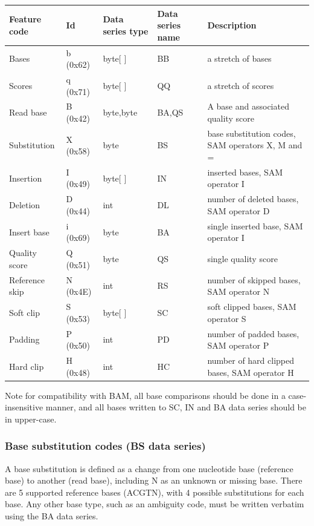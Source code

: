 \documentclass[a4paper]{article}
\begin{document}
\begin{tabular}{|>{\raggedright}p{91pt}|>{\raggedright}p{45pt}|>{\raggedright}p{72pt}|>{\raggedright}p{66pt}|>{\raggedright}p{132pt}|}
\hline
\textbf{Feature code} & \textbf{Id} & \textbf{Data series type} & \textbf{Data 
series name} & \textbf{Description}\tabularnewline
\hline
Bases & b (0x62) & byte[ ] & BB & a stretch of bases\tabularnewline
\hline
Scores & q (0x71) & byte[ ] & QQ & a stretch of scores\tabularnewline
\hline
%
Read base & B (0x42) & byte,byte & BA,QS & A base and associated quality score\tabularnewline
\hline
Substitution & X (0x58) & byte & BS & base substitution codes, SAM operators X, 
M and =\tabularnewline
\hline
Insertion & I (0x49) & byte[ ] & IN & inserted bases, SAM operator I\tabularnewline
\hline
Deletion & D (0x44) & int & DL & number of deleted bases, SAM operator D\tabularnewline
\hline
Insert base & i (0x69) & byte & BA & single inserted base, SAM operator I\tabularnewline
\hline
Quality score & Q (0x51) & byte & QS & single quality score\tabularnewline
\hline
Reference skip & N (0x4E) & int & RS & number of skipped bases, SAM operator N\tabularnewline
\hline
Soft clip & S (0x53) & byte[ ] & SC & soft clipped bases, SAM operator S\tabularnewline
\hline
Padding & P (0x50) & int & PD & number of padded bases, SAM operator P\tabularnewline
\hline
Hard clip & H (0x48) & int & HC & number of hard clipped bases, SAM operator H\tabularnewline
\hline
\end{tabular}

Note for compatibility with BAM, all base comparisons should be done
in a case-insensitive manner, and all bases written to SC, IN and BA
data series should be in upper-case.

\subsubsection*{Base substitution codes (BS data series)}

A base substitution is defined as a change from one nucleotide base
(reference base) to another (read base), including N as an unknown or
missing base. There are 5 supported reference bases (ACGTN), with 4
possible substitutions for each base.  Any other base type, such as an
ambiguity code, must be written verbatim using the BA data series.
\end{document}
